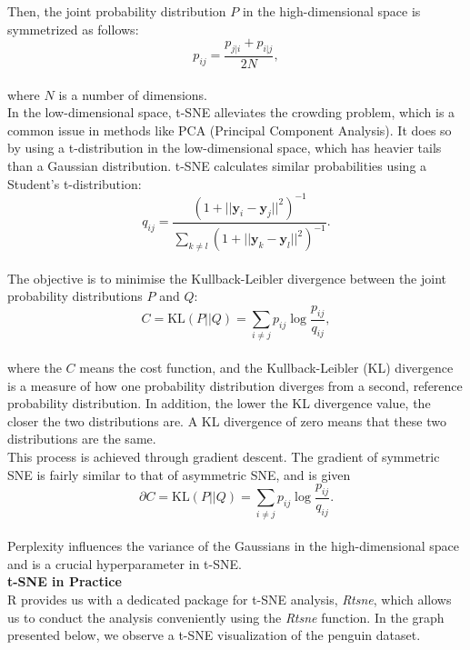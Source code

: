 \documentclass{article}\usepackage[]{graphicx}\usepackage[]{xcolor}
\numberwithin{equation}{section}
\begin{document}
{\noindent
Then, the joint probability distribution $P$ in the high-dimensional space is symmetrized as follows:
    \[
        p_{ij} = \frac{p_{j|i} + p_{i|j}}{2N},
    \] \\
\noindent
where $N$ is a number of dimensions.\\

\noindent
In the low-dimensional space, t-SNE alleviates the crowding problem, which is a common issue in methods like PCA (Principal Component Analysis). It does so by using a t-distribution in the low-dimensional space, which has heavier tails than a Gaussian distribution. t-SNE calculates similar probabilities using a Student's t-distribution:
    \[
        q_{ij} = \frac{(1 + ||\mathbf{y}_i - \mathbf{y}_j||^2)^{-1}}{\sum_{k \neq l}(1 + ||\mathbf{y}_k - \mathbf{y}_l||^2)^{-1}}.
    \] \\
    
\noindent
The objective is to minimise the Kullback-Leibler divergence between the joint probability distributions $P$ and $Q$:
    \[
        C = \text{KL}(P || Q) = \sum_{i \neq j} p_{ij} \log \frac{p_{ij}}{q_{ij}},
    \] \\
\noindent
where the $C$ means the cost function, and the Kullback-Leibler (KL) divergence is a measure of how one probability distribution diverges from a second, reference probability distribution. In addition, the lower the KL divergence value, the closer the two distributions are. A KL divergence of zero means that these two distributions are the same.\\

\noindent
This process is achieved through gradient descent. The gradient of symmetric SNE is fairly similar to that of asymmetric SNE, and is given 
\[
        \partial C = \text{KL}(P || Q) = \sum_{i \neq j} p_{ij} \log \frac{p_{ij}}{q_{ij}}.
    \] \\
    
\noindent
Perplexity influences the variance of the Gaussians in the high-dimensional space and is a crucial hyperparameter in t-SNE.\\

\noindent \textbf{t-SNE in Practice}\\

\noindent
R provides us with a dedicated package for t-SNE analysis, \textit{Rtsne}, which allows us to conduct the analysis conveniently using the \textit{Rtsne} function. In the graph presented below, we observe a t-SNE visualization of the penguin dataset.\\
\\

}
\end{document}
